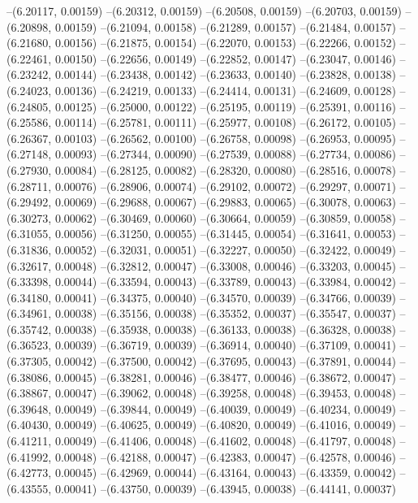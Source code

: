 --(6.20117, 0.00159)
--(6.20312, 0.00159)
--(6.20508, 0.00159)
--(6.20703, 0.00159)
--(6.20898, 0.00159)
--(6.21094, 0.00158)
--(6.21289, 0.00157)
--(6.21484, 0.00157)
--(6.21680, 0.00156)
--(6.21875, 0.00154)
--(6.22070, 0.00153)
--(6.22266, 0.00152)
--(6.22461, 0.00150)
--(6.22656, 0.00149)
--(6.22852, 0.00147)
--(6.23047, 0.00146)
--(6.23242, 0.00144)
--(6.23438, 0.00142)
--(6.23633, 0.00140)
--(6.23828, 0.00138)
--(6.24023, 0.00136)
--(6.24219, 0.00133)
--(6.24414, 0.00131)
--(6.24609, 0.00128)
--(6.24805, 0.00125)
--(6.25000, 0.00122)
--(6.25195, 0.00119)
--(6.25391, 0.00116)
--(6.25586, 0.00114)
--(6.25781, 0.00111)
--(6.25977, 0.00108)
--(6.26172, 0.00105)
--(6.26367, 0.00103)
--(6.26562, 0.00100)
--(6.26758, 0.00098)
--(6.26953, 0.00095)
--(6.27148, 0.00093)
--(6.27344, 0.00090)
--(6.27539, 0.00088)
--(6.27734, 0.00086)
--(6.27930, 0.00084)
--(6.28125, 0.00082)
--(6.28320, 0.00080)
--(6.28516, 0.00078)
--(6.28711, 0.00076)
--(6.28906, 0.00074)
--(6.29102, 0.00072)
--(6.29297, 0.00071)
--(6.29492, 0.00069)
--(6.29688, 0.00067)
--(6.29883, 0.00065)
--(6.30078, 0.00063)
--(6.30273, 0.00062)
--(6.30469, 0.00060)
--(6.30664, 0.00059)
--(6.30859, 0.00058)
--(6.31055, 0.00056)
--(6.31250, 0.00055)
--(6.31445, 0.00054)
--(6.31641, 0.00053)
--(6.31836, 0.00052)
--(6.32031, 0.00051)
--(6.32227, 0.00050)
--(6.32422, 0.00049)
--(6.32617, 0.00048)
--(6.32812, 0.00047)
--(6.33008, 0.00046)
--(6.33203, 0.00045)
--(6.33398, 0.00044)
--(6.33594, 0.00043)
--(6.33789, 0.00043)
--(6.33984, 0.00042)
--(6.34180, 0.00041)
--(6.34375, 0.00040)
--(6.34570, 0.00039)
--(6.34766, 0.00039)
--(6.34961, 0.00038)
--(6.35156, 0.00038)
--(6.35352, 0.00037)
--(6.35547, 0.00037)
--(6.35742, 0.00038)
--(6.35938, 0.00038)
--(6.36133, 0.00038)
--(6.36328, 0.00038)
--(6.36523, 0.00039)
--(6.36719, 0.00039)
--(6.36914, 0.00040)
--(6.37109, 0.00041)
--(6.37305, 0.00042)
--(6.37500, 0.00042)
--(6.37695, 0.00043)
--(6.37891, 0.00044)
--(6.38086, 0.00045)
--(6.38281, 0.00046)
--(6.38477, 0.00046)
--(6.38672, 0.00047)
--(6.38867, 0.00047)
--(6.39062, 0.00048)
--(6.39258, 0.00048)
--(6.39453, 0.00048)
--(6.39648, 0.00049)
--(6.39844, 0.00049)
--(6.40039, 0.00049)
--(6.40234, 0.00049)
--(6.40430, 0.00049)
--(6.40625, 0.00049)
--(6.40820, 0.00049)
--(6.41016, 0.00049)
--(6.41211, 0.00049)
--(6.41406, 0.00048)
--(6.41602, 0.00048)
--(6.41797, 0.00048)
--(6.41992, 0.00048)
--(6.42188, 0.00047)
--(6.42383, 0.00047)
--(6.42578, 0.00046)
--(6.42773, 0.00045)
--(6.42969, 0.00044)
--(6.43164, 0.00043)
--(6.43359, 0.00042)
--(6.43555, 0.00041)
--(6.43750, 0.00039)
--(6.43945, 0.00038)
--(6.44141, 0.00037)
